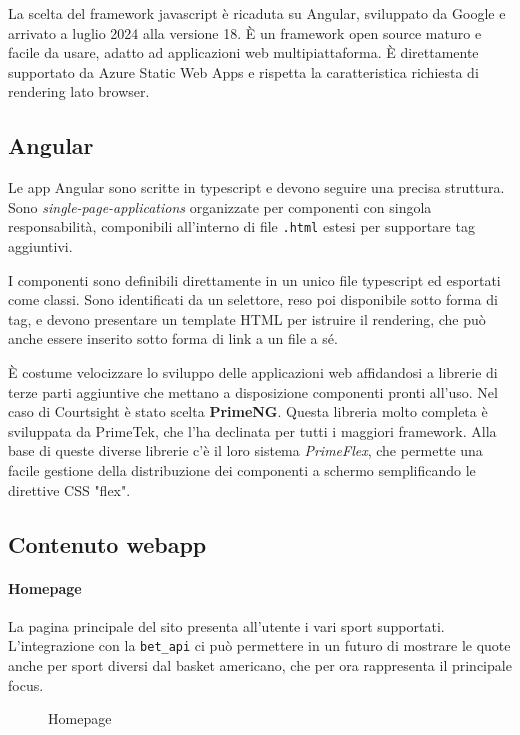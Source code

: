 La scelta del framework javascript è ricaduta su Angular, sviluppato da Google e arrivato a luglio 2024 alla versione 18. È un framework open source maturo e facile da usare, adatto ad applicazioni web multipiattaforma.
È direttamente supportato da Azure Static Web Apps e rispetta la caratteristica richiesta di rendering lato browser.


\subsection{Angular}
Le app Angular sono scritte in typescript e devono seguire una precisa struttura. Sono \textit{single-page-applications} organizzate per componenti con singola responsabilità, componibili all'interno di file \texttt{.html} estesi per supportare tag aggiuntivi.

I componenti sono definibili direttamente in un unico file typescript ed esportati come classi. Sono identificati da un selettore, reso poi disponibile sotto forma di tag, e devono presentare un template HTML per istruire il rendering, che può anche essere inserito sotto forma di link a un file a sé.

È costume velocizzare lo sviluppo delle applicazioni web affidandosi a librerie di terze parti aggiuntive che mettano a disposizione componenti pronti all'uso. Nel caso di Courtsight è stato scelta \textbf{PrimeNG}.
Questa libreria molto completa è sviluppata da PrimeTek, che l'ha declinata per tutti i maggiori framework. Alla base di queste diverse librerie c'è il loro sistema \textit{PrimeFlex}, che permette una facile gestione della distribuzione dei componenti a schermo semplificando le direttive CSS "flex".

\subsection{Contenuto webapp}
    \paragraph{Homepage} La pagina principale del sito presenta all'utente i vari sport supportati. L'integrazione con la \texttt{bet\_api} ci può permettere in un futuro di mostrare le quote anche per sport diversi dal basket americano, che per ora rappresenta il principale focus.
    
    \begin{figure}[H]
        \centering
        \caption{Homepage}
        \label{fig:enter-label}
    \end{figure}
    
